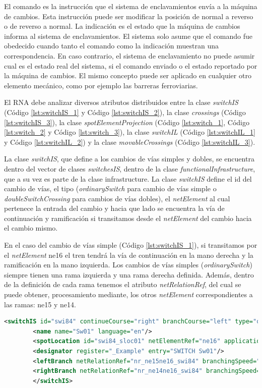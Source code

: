     El comando es la instrucción que el sistema de enclavamientos envía a la máquina de cambios. Esta instrucción puede ser modificar la posición de normal a reverso o de reverso a normal. La indicación es el estado que la máquina de cambios informa al sistema de enclavamientos. El sistema solo asume que el comando fue obedecido cuando tanto el comando como la indicación muestran una correspondencia. En caso contrario, el sistema de enclavamiento no puede asumir cual es el estado real del sistema, si el comando enviado o el estado reportado por la máquina de cambios. El mismo concepto puede ser aplicado en cualquier otro elemento mecánico, como por ejemplo las barreras ferroviarias.

    El RNA debe analizar diversos atributos distribuidos entre la clase \textit{switchIS} (Código \ref{lst:switchIS_1} y Código \ref{lst:switchIS_2}), la clase \textit{crossings} (Código \ref{lst:switchIS_3}), la clase \textit{spotElementProjection} (Código \ref{lst:switch_1}, Código \ref{lst:switch_2} y Código \ref{lst:switch_3}), la clase \textit{switchIL} (Código \ref{lst:switchIL_1} y Código \ref{lst:switchIL_2}) y la clase \textit{movableCrossings} (Código \ref{lst:switchIL_3}). 
    
    La clase \textit{switchIS}, que define a los cambios de vías simples y dobles, se encuentra dentro del vector de clases \textit{switchesIS}, dentro de la clase \textit{functionalInfrastructure}, que a su vez es parte de la clase infrastructure. La clase \textit{switchIS} define el id del cambio de vías, el tipo (\textit{ordinarySwitch} para cambio de vías simple o \textit{doubleSwitchCrossing} para cambios de vías dobles), el \textit{netElement} al cual pertenece la entrada del cambio y hacia que lado se encuentra la vía de continuación y ramificación si transitamos desde el \textit{netElement} del cambio hacia el cambio mismo. 
    
    En el caso del cambio de vías simple (Código \ref{lst:switchIS_1}), si transitamos por el \textit{netElement} ne16 el tren tendrá la vía de continuación en la mano derecha y la ramificación en la mano izquierda. Los cambios de vías simples (\textit{ordinarySwitch}) siempre tienen una rama izquierda y una rama derecha definida. Además, dentro de la definición de cada rama tenemos el atributo \textit{netRelationRef}, del cual se puede obtener, procesamiento mediante, los otros \textit{netElement} correspondientes a las ramas: ne15 y ne14. 
    
    \begin{lstlisting}[language = XML, caption = Clase \textit{switchIS} (ordinarySwitch) , label = {lst:switchIS_1}]
    	<switchIS id="swi84" continueCourse="right" branchCourse="left" type="ordinarySwitch">
    	<name name="Sw01" language="en"/>
    	<spotLocation id="swi84_sloc01" netElementRef="ne16" applicationDirection="reverse" intrinsicCoord="0.0000"/>
    	<designator register="_Example" entry="SWITCH Sw01"/>
    	<leftBranch netRelationRef="nr_ne15ne16_swi84" branchingSpeed="0" joiningSpeed="0" radius="-500"/>
    	<rightBranch netRelationRef="nr_ne14ne16_swi84" branchingSpeed="0" joiningSpeed="0" radius="0"/>
    	</switchIS>
    \end{lstlisting}
    
